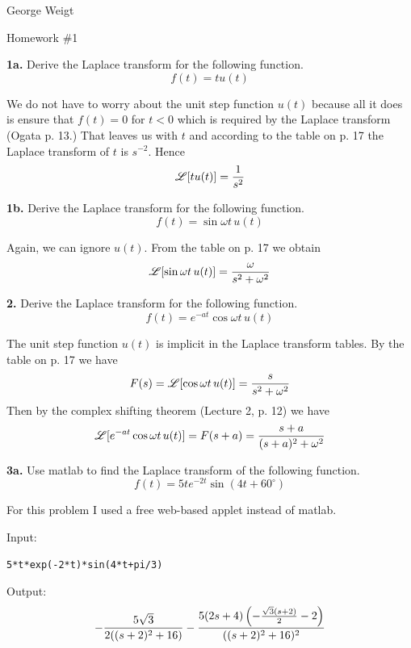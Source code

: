 \documentclass[11pt]{report}
\begin{document}
\noindent
George Weigt

\noindent
Homework \#1

\bigskip
\noindent
{\bf 1a.} Derive the Laplace transform for the following function.
$$f(t)=tu(t)$$

\bigskip
\noindent
We do not have to worry about the unit step function $u(t)$ because all
it does is ensure that $f(t) = 0$ for $t<0$ which is required by the
Laplace transform
(Ogata p. 13.)
That leaves us with $t$ and according to the table on p. 17
the Laplace transform of $t$ is $s^{-2}$.
Hence
$${\mathscr L}[tu(t)]={1\over s^2}$$

\bigskip
\noindent
{\bf 1b.} Derive the Laplace transform for the following function.
$$f(t)=\sin\omega t\,u(t)$$

\bigskip
\noindent
Again, we can ignore $u(t)$.
From the table on p. 17 we obtain
$${\mathscr L}[\sin\omega t\,u(t)]={\omega\over s^2+\omega^2}$$

\bigskip
\noindent
{\bf 2.} Derive the Laplace transform for the following function.
$$f(t)=e^{-at}\cos\omega t\,u(t)$$

\bigskip
\noindent
The unit step function $u(t)$ is implicit in the Laplace transform tables.
By the table on p. 17 we have
$$F(s)={\mathscr L}[\cos\omega t\,u(t)]={s\over s^2+\omega^2}$$
Then by the complex shifting theorem (Lecture 2, p. 12) we have
$${\mathscr L}[e^{-at}\cos\omega t\,u(t)]=F(s+a)={s+a\over (s+a)^2+\omega^2}$$

\newpage

\noindent
{\bf 3a.} Use {\sc matlab} to find the Laplace transform of the following
function.
$$f(t)=5te^{-2t}\sin(4t+60^\circ)$$

\bigskip
\noindent
For this problem I used a free web-based applet instead of {\sc matlab}.

\bigskip
\noindent
Input:
\begin{center}
\verb$5*t*exp(-2*t)*sin(4*t+pi/3)$
\end{center}

\bigskip
\noindent
Output:
$$-{5\sqrt3\over2((s+2)^2+16)}
-{5(2s+4)\left(-{\sqrt3(s+2)\over2}-2\right)\over((s+2)^2+16)^2}$$
\end{document}
